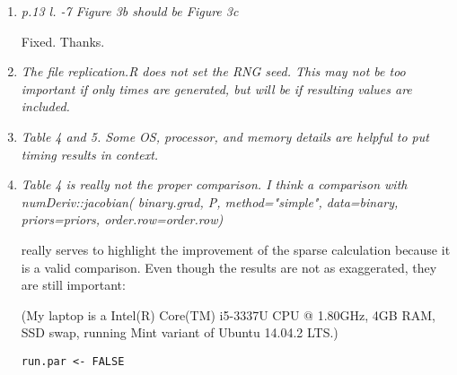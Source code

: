 \documentclass{article}
\newenvironment{revQuote}{\itshape}{\vspace{\baselineskip}}
\newenvironment{response}{\normalfont}{\vspace{\baselineskip}}
\begin{document}
\begin{enumerate}
\begin{revQuote}
  \end{revQuote}

\begin{response}
  
\end{response}


\item \begin{revQuote}
 p.13  l. -7  Figure 3b  should be Figure 3c
  \end{revQuote}

\begin{response}
  Fixed.  Thanks.
\end{response}


\item \begin{revQuote}
 The file replication.R does not set the RNG seed. This may not be too
important if only times are generated, but will be if resulting values are
included.
    
  \end{revQuote}

\begin{response}
  
\end{response}


\item \begin{revQuote}
Table 4 and 5. Some OS, processor, and memory details are helpful to put
timing results in context.
  \end{revQuote}

\begin{response}
  
\end{response}


\item\begin{revQuote}
Table 4 is really not the proper comparison. I think a comparison with
       numDeriv::jacobian( binary.grad, P, method="simple", 
                   data=binary, priors=priors,
order.row=order.row)

really serves to highlight the improvement of the sparse calculation because
it is a valid comparison. Even though the results are not as exaggerated,
they are still important:

(My laptop is a  Intel(R) Core(TM) i5-3337U CPU @ 1.80GHz,  4GB RAM, SSD
swap, running Mint variant of Ubuntu 14.04.2 LTS.)

\begin{verbatim}
run.par <- FALSE


\end{verbatim}
\end{revQuote}
\end{enumerate}
\end{document}
